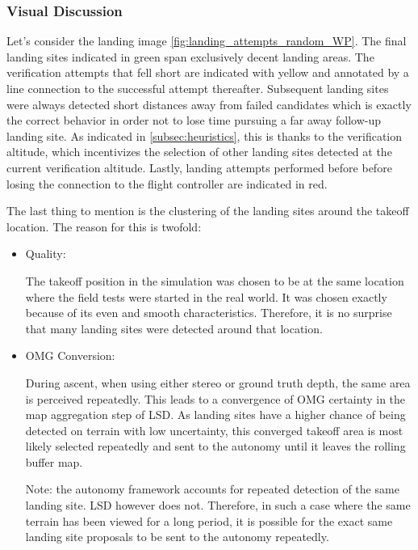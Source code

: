     \subsubsection{Visual Discussion}
    Let's consider the landing image \ref{fig:landing_attempts_random_WP}. The final landing sites indicated in green span exclusively decent landing areas. The verification attempts that fell short are indicated with yellow and annotated by a line connection to the successful attempt thereafter. Subsequent landing sites were always detected short distances away from failed candidates which is exactly the correct behavior in order not to lose time pursuing a far away follow-up landing site. As indicated in \cref{subsec:heuristics}, this is thanks to the verification altitude, which incentivizes the selection of other landing sites detected at the current verification altitude. Lastly, landing attempts performed before before losing the connection to the flight controller are indicated in red. 
    

    The last thing to mention is the clustering of the landing sites around the takeoff location. The reason for this is twofold:
    \begin{itemize}
        \item Quality: 
        
        The takeoff position in the simulation was chosen to be at the same location where the field tests were started in the real world. It was chosen exactly because of its even and smooth characteristics. Therefore, it is no surprise that many landing sites were detected around that location. 
        \item OMG Conversion: 
        
        During ascent, when using either stereo or ground truth depth, the same area is perceived repeatedly. This leads to a convergence of OMG certainty in the map aggregation step of LSD. As landing sites have a higher chance of being detected on terrain with low uncertainty, this converged takeoff area is most likely selected repeatedly and sent to the autonomy until it leaves the rolling buffer map. 
        
        Note: the autonomy framework accounts for repeated detection of the same landing site. LSD however does not. Therefore, in such a case where the same terrain has been viewed for a long period, it is possible for the exact same landing site proposals to be sent to the autonomy repeatedly.
    \end{itemize}


